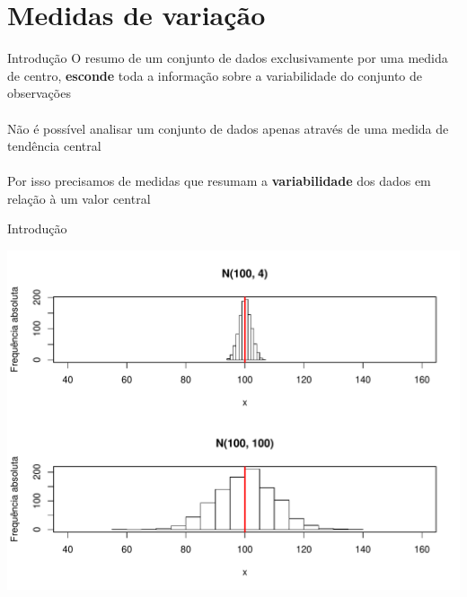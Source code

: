\documentclass[10pt]{beamer}\usepackage[]{graphicx}\usepackage[]{color}
\newenvironment{knitrout}{}{} %
\theoremstyle{definition}
\begin{document}
\section{Medidas de variação}

\begin{frame}{Introdução}
 O resumo de um conjunto de dados exclusivamente por uma medida de
 centro, \textbf{esconde} toda a informação sobre a variabilidade do
 conjunto de observações \\~\\
 Não é possível analisar um conjunto de dados apenas através de uma
 medida de tendência central \\~\\
 Por isso precisamos de medidas que resumam a \textbf{variabilidade} dos
 dados em relação à um valor central
\end{frame}

\begin{frame}{Introdução}
\begin{knitrout}\footnotesize
{}\color{fgcolor}

{\centering \includegraphics[width=.95\textwidth]{figure/unnamed-chunk-2-1} 

}



\end{knitrout}
\end{frame}
\end{document}
